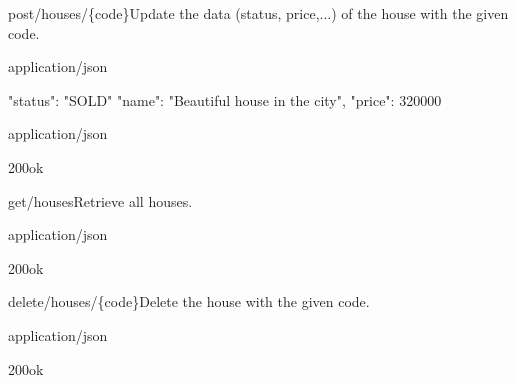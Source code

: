 \begin{oefening}
\begin{apiRoute}{post}{/houses/\{code\}}{Update the data (status, price,...) of the house with the given code.}
\begin{routeParameter}
\end{routeParameter}
\begin{routeRequest}{application/json}
\begin{routeRequestBody}
{
  "status": "SOLD"
  "name": "Beautiful house in the city",
  "price": 320000
}
\end{routeRequestBody}
\end{routeRequest}
\begin{routeResponse}{application/json}
\begin{routeResponseItem}{200}{ok}
\end{routeResponseItem}
\end{routeResponse}
\end{apiRoute}

\begin{apiRoute}{get}{/houses}{Retrieve all houses.}
\begin{routeParameter}
\end{routeParameter}
\begin{routeResponse}{application/json}
\begin{routeResponseItem}{200}{ok}
\begin{routeResponseItemBody}
\end{routeResponseItemBody}
\end{routeResponseItem}
\end{routeResponse}
\end{apiRoute}

\begin{apiRoute}{delete}{/houses/\{code\}}{Delete the house with the given code.}
\begin{routeParameter}
\end{routeParameter}
\begin{routeResponse}{application/json}
\begin{routeResponseItem}{200}{ok}
\end{routeResponseItem}
\end{routeResponse}
\end{apiRoute}

\end{oefening}